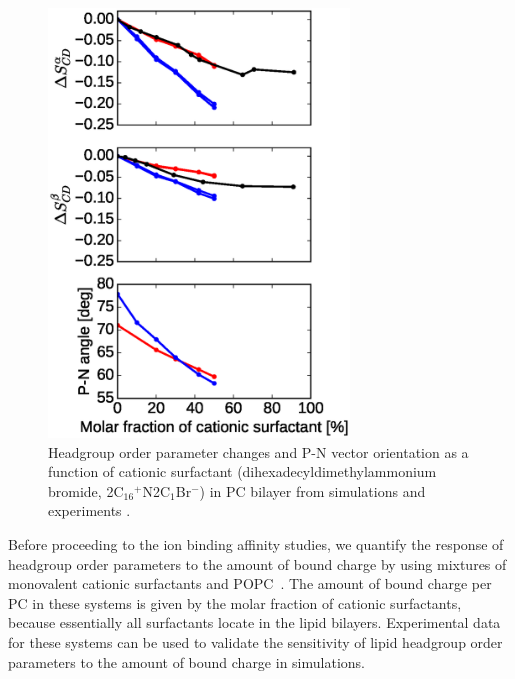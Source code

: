 \documentclass[aip,jcp,twocolumn]{revtex4}
\begin{document}
\begin{figure}[tbp]
  \centering
  \includegraphics[width=8.0cm]{../Fig/ipython_nb/PN_angle_OrdPars-A-B_L14-ECCL17_q80_sig89_surf.eps}
  \caption{\label{OrderParameterCHANGESsurf}
    Headgroup order parameter changes and P-N vector orientation as a function of
    cationic surfactant (dihexadecyldimethylammonium bromide, 2C$_{16}$$^+$N2C$_1$Br$^-$)
    in PC bilayer from simulations and experiments \cite{scherer89}.
  }
\end{figure}

Before proceeding to the ion binding affinity studies, we quantify
the response of headgroup order parameters to the amount of 
bound charge by using mixtures of monovalent cationic surfactants
and POPC~\cite{scherer89}. The amount of bound charge per PC 
in these systems is given by the molar fraction of cationic 
surfactants, because essentially all surfactants locate in the 
lipid bilayers. Experimental data for these systems can be used to validate 
the sensitivity of lipid headgroup order parameters
to the amount of bound charge in simulations.

%
\end{document}
